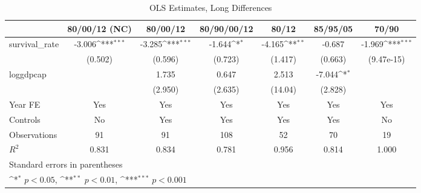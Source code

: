 \begin{table}[htbp]\centering
\def\sym#1{\ifmmode^{#1}\else\(^{#1}\)\fi}
\caption{OLS Estimates, Long Differences}
\begin{tabular}{l*{6}{c}}
\hline\hline
                &\multicolumn{1}{c}{80/00/12 (NC)}&\multicolumn{1}{c}{80/00/12}&\multicolumn{1}{c}{80/90/00/12}&\multicolumn{1}{c}{80/12}&\multicolumn{1}{c}{85/95/05}&\multicolumn{1}{c}{70/90}\\
\hline
survival\_rate   &   -3.006\sym{***}&   -3.285\sym{***}&   -1.644\sym{*}  &   -4.165\sym{**} &   -0.687         &   -1.969\sym{***}\\
                &  (0.502)         &  (0.596)         &  (0.723)         &  (1.417)         &  (0.663)         &(9.47e-15)         \\
[1em]
loggdpcap       &                  &    1.735         &    0.647         &    2.513         &   -7.044\sym{*}  &                  \\
                &                  &  (2.950)         &  (2.635)         &  (14.04)         &  (2.828)         &                  \\
[1em]
Year FE         &      Yes         &      Yes         &      Yes         &      Yes         &      Yes         &      Yes         \\
[1em]
Controls        &       No         &      Yes         &      Yes         &      Yes         &      Yes         &       No         \\
\hline
Observations    &       91         &       91         &      108         &       52         &       70         &       19         \\
\(R^{2}\)       &    0.831         &    0.834         &    0.781         &    0.956         &    0.814         &    1.000         \\
\hline\hline
\multicolumn{7}{l}{\footnotesize Standard errors in parentheses}\\
\multicolumn{7}{l}{\footnotesize \sym{*} \(p<0.05\), \sym{**} \(p<0.01\), \sym{***} \(p<0.001\)}\\
\end{tabular}
\end{table}
